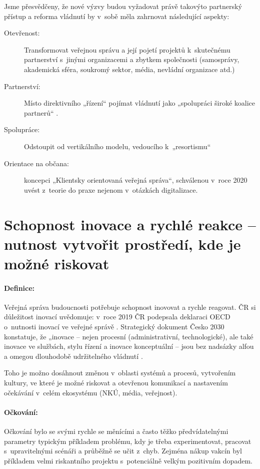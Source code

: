 Jsme přesvědčeny, že nové výzvy budou vyžadovat právě takovýto partnerský přístup \cite{christopher_blueprint_2021} a reforma vládnutí by v~sobě měla zahrnovat následující aspekty:

\begin{description}
  \item[Otevřenost:] Transformovat veřejnou správu a její pojetí projektů k~skutečnému partnerství s~jinými organizacemi a zbytkem společnosti (samosprávy, akademická sféra, soukromý sektor, média, nevládní organizace atd.)
  \item[Partnerství:] Místo direktivního „řízení“ pojímat vládnutí jako „spolupráci široké koalice partnerů“ \cite{department_of_the_prime_minister_and_cabinet_our_2019}.
  \item[Spolupráce:] Odstoupit od vertikálního modelu, vedoucího k~„resortismu“
  \item[Orientace na občana:] koncepci „Klientsky orientovaná veřejná správa“, schválenou v~roce 2020 \cite{koncepce_verejna_sprava_2030} uvést z~teorie do praxe nejenom v~otázkách digitalizace.
\end{description}

\section*{Schopnost inovace a rychlé reakce -- nutnost vytvořit prostředí, kde je možné riskovat}

\paragraph{Definice:} Veřejná správa budoucnosti potřebuje schopnost inovovat a rychle reagovat. ČR si důležitost inovací uvědomuje: v~roce 2019 ČR podepsala deklaraci OECD o~nutnosti inovací ve veřejné správě \cite{oecd_deklarace_2019}. Strategický dokument Česko 2030 konstatuje, že „inovace – nejen procesní (administrativní, technologické), ale také inovace ve službách, stylu řízení a inovace konceptuální – jsou bez nadsázky alfou a omegou dlouhodobě udržitelného vládnutí \cite{sr2030}.

Toho je možno dosáhnout změnou v~oblasti systémů a procesů, vytvořením kultury, ve které je možné riskovat a otevřenou komunikací a nastavením očekávání v~celém ekosystému (NKÚ, média, veřejnost).

\paragraph{Očkování:} Očkování bylo se svými rychle se měnícími a často těžko předvídatelnými parametry typickým příkladem problému, kdy je třeba experimentovat, pracovat s~upravitelnými scénáři a průběžně se učit z~chyb. Zejména nákup vakcín byl příkladem velmi riskantního projektu s~potenciálně velkým pozitivním dopadem.

